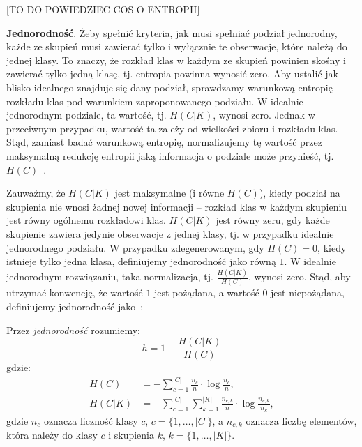 \documentclass{praca1}
\begin{document}
[TO DO POWIEDZIEC COS O ENTROPII]

\textbf{Jednorodność}. Żeby spełnić kryteria, jak musi spełniać podział jednorodny, każde ze skupień musi zawierać tylko i wyłącznie te obserwacje, które należą do jednej klasy. To znaczy, że rozkład klas w każdym ze skupień powinien skośny i zawierać tylko jedną klasę, tj. entropia powinna wynosić zero. Aby ustalić jak blisko idealnego znajduje się dany podział, sprawdzamy warunkową entropię rozkładu klas pod warunkiem zaproponowanego podziału. W idealnie jednorodnym podziale, ta wartość, tj. $H(C|K)$, wynosi zero. Jednak w przeciwnym przypadku, wartość ta zależy od wielkości zbioru i rozkładu klas. Stąd, zamiast badać warunkową entropię, normalizujemy tę wartość przez maksymalną redukcję entropii jaką informacja o podziale może przynieść, tj. $H(C)$~\cite{Rosenberg2007:vmeasure}.

Zauważmy, że $H(C|K)$ jest maksymalne (i równe $H(C)$), kiedy podział na skupienia nie wnosi żadnej nowej informacji -- rozkład klas w każdym skupieniu jest równy ogólnemu rozkładowi klas. $H(C|K)$ jest równy zeru, gdy każde skupienie zawiera jedynie obserwacje z jednej klasy, tj. w przypadku idealnie jednorodnego podziału. W przypadku zdegenerowanym, gdy $H(C) = 0$, kiedy istnieje tylko jedna klasa, definiujemy jednorodność jako równą $1$. W idealnie jednorodnym rozwiązaniu, taka normalizacja, tj. $\frac{H(C|K)}{H(C)}$, wynosi zero. Stąd, aby utrzymać konwencję, że wartość $1$ jest pożądana, a wartość $0$ jest niepożądana, definiujemy jednorodność jako~\cite{Rosenberg2007:vmeasure}:

\begin{definition}
Przez \emph{jednorodność} rozumiemy:
\begin{equation}
h = %
1 - \frac{H(C|K)}{H(C)} %
\end{equation}
gdzie:
\begin{align*}
H(C) & = - \sum\limits_{c = 1}^{|C|}\frac{n_c}{n}\cdot \log{\frac{n_c}{n}},  \\
H(C|K) & = - \sum\limits_{c = 1}^{|C|}\sum\limits_{k = 1}^{|K|}\frac{n_{c,k}}{n}\cdot \log{\frac{n_{c,k}}{n_k}},
\end{align*}
gdzie $n_c$ oznacza liczność klasy $c$, $c = \{1,\ldots, |C|\}$, a $n_{c,k}$ oznacza liczbę elementów, która należy do klasy $c$ i skupienia $k$, $k = \{1,\ldots, |K|\}$.
\end{definition}
\end{document}
